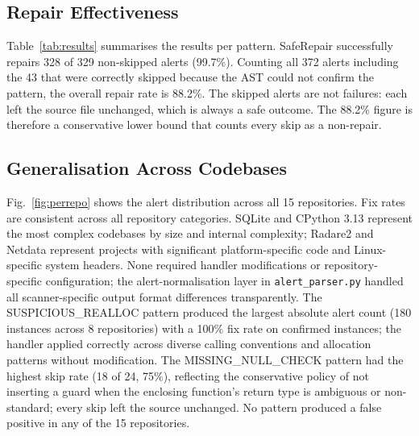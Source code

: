 \documentclass[conference]{IEEEtran}
\begin{document}
\subsection{Repair Effectiveness}
Table~\ref{tab:results} summarises the results per pattern. SafeRepair successfully
repairs 328 of 329 non-skipped alerts (99.7\%). Counting all 372 alerts including
the 43 that were correctly skipped because the AST could not confirm the pattern,
the overall repair rate is 88.2\%. The skipped alerts are not failures: each left
the source file unchanged, which is always a safe outcome. The 88.2\% figure is
therefore a conservative lower bound that counts every skip as a non-repair.

\subsection{Generalisation Across Codebases}
Fig.~\ref{fig:perrepo} shows the alert distribution across all 15 repositories.
Fix rates are consistent across all repository categories. SQLite and CPython 3.13
represent the most complex codebases by size and internal complexity; Radare2 and
Netdata represent projects with significant platform-specific code and
Linux-specific system headers. None required handler modifications or
repository-specific configuration; the alert-normalisation layer in
\texttt{alert\_parser.py} handled all scanner-specific output format differences
transparently. The SUSPICIOUS\_REALLOC pattern produced the largest absolute alert
count (180 instances across 8 repositories) with a 100\% fix rate on confirmed
instances; the handler applied correctly across diverse calling conventions and
allocation patterns without modification. The MISSING\_NULL\_CHECK pattern had the
highest skip rate (18 of 24, 75\%), reflecting the conservative policy of not
inserting a guard when the enclosing function's return type is ambiguous or
non-standard; every skip left the source unchanged. No pattern produced a false
positive in any of the 15 repositories.
\end{document}

